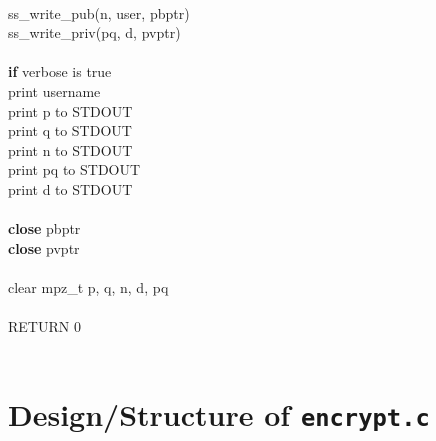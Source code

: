 \documentclass[12pt]{article}
\begin{document}
\\
\indent ss\_write\_pub(n, user, pbptr) \\
\indent ss\_write\_priv(pq, d, pvptr) \\
\\
\indent \textbf{if} verbose is true \\
\indent \indent print username \\
\indent \indent print p to STDOUT \\
\indent \indent print q to STDOUT \\
\indent \indent print n to STDOUT \\
\indent \indent print pq to STDOUT \\
\indent \indent print d to STDOUT \\
\\
\indent \textbf{close} pbptr \\
\indent \textbf{close} pvptr \\
\\
\indent clear mpz\_t p, q, n, d, pq \\
\\
\indent RETURN 0 \\
\\
\section{Design/Structure of \texttt{encrypt.c}}
\end{document}

